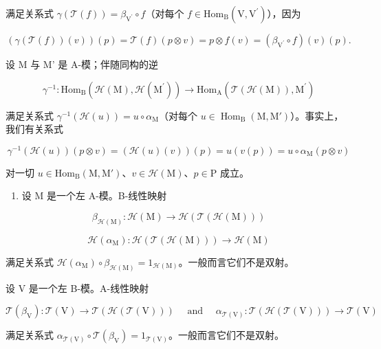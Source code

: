 满足关系式 \(\gamma (\mathcal{T}(f)) = \beta_{\mathrm{V}^{\prime}}\circ f\)（对每个 \(f\in \mathrm{Hom}_{\mathrm{B}}(\mathrm{V},\mathrm{V}^{\prime})\)），因为

\[
(\gamma (\mathcal {T} (f)) (v)) (p) = \mathcal {T} (f) (p \otimes v) = p \otimes f (v) = (\beta_ {\mathrm{V} ^ {\prime}} \circ f) (v) (p).
\]

设 M 与 M' 是 A-模；伴随同构的逆

\[
\gamma^ {- 1}: \mathrm{Hom} _ {\mathrm{B}} (\mathcal {H} (\mathrm{M}), \mathcal {H} (\mathrm{M} ^ {\prime})) \longrightarrow \mathrm{Hom} _ {\mathrm{A}} (\mathcal {T} (\mathcal {H} (\mathrm{M})), \mathrm{M} ^ {\prime})
\]

满足关系式 \(\gamma^{-1}(\mathcal{H}(u)) = u \circ \alpha_{\mathrm{M}}\)（对每个 \(u \in \operatorname{Hom}_{\mathrm{B}}(\mathrm{M}, \mathrm{M}')\)）。事实上，我们有关系式

\[
\gamma^ {- 1} (\mathcal {H} (u)) (p \otimes v) = (\mathcal {H} (u) (v)) (p) = u (v (p)) = u \circ \alpha_ {\mathrm{M}} (p \otimes v)
\]

对一切 \(u \in \mathrm{Hom}_{\mathrm{B}}(\mathrm{M}, \mathrm{M}')\)、\(v \in \mathcal{H}(\mathrm{M})\)、\(p \in \mathrm{P}\) 成立。

\begin{enumerate}
\def\labelenumi{\arabic{enumi})}
\setcounter{enumi}{1}
\tightlist
\item
  设 \(\mathrm{M}\) 是一个左 A-模。B-线性映射
\end{enumerate}

\[
\beta_ {\mathcal {H} (\mathrm{M})}: \mathcal {H} (\mathrm{M}) \to \mathcal {H} (\mathcal {T} (\mathcal {H} (\mathrm{M})))
\]

\[
\mathcal {H} (\alpha_ {\mathrm{M}}): \mathcal {H} (\mathcal {T} (\mathcal {H} (\mathrm{M}))) \to \mathcal {H} (\mathrm{M})
\]

满足关系式 \(\mathcal{H}(\alpha_{\mathrm{M}})\circ\beta_{\mathcal{H}(\mathrm{M})}=1_{\mathcal{H}(\mathrm{M})}\)。一般而言它们不是双射。

设 V 是一个左 B-模。A-线性映射

\[
\mathcal {T} (\beta_ {\mathrm{V}}): \mathcal {T} (\mathrm{V}) \to \mathcal {T} (\mathcal {H} (\mathcal {T} (\mathrm{V}))) \quad \text { and } \quad \alpha_ {\mathcal {T} (\mathrm{V})}: \mathcal {T} (\mathcal {H} (\mathcal {T} (\mathrm{V}))) \to \mathcal {T} (\mathrm{V})
\]

满足关系式 \(\alpha_{\mathcal{T}(\mathrm{V})}\circ \mathcal{T}(\beta_{\mathrm{V}}) = 1_{\mathcal{T}(\mathrm{V})}\)。一般而言它们不是双射。


